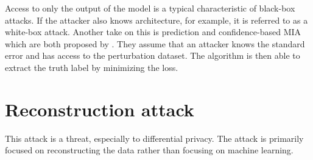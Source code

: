 Access to only the output of the model is a typical characteristic of black-box attacks. If the attacker also knows architecture, for example, it is referred to as a white-box attack.
Another take on this is prediction and confidence-based MIA which are both proposed by \citep{yeom_privacy_2018}.
They assume that an attacker knows the standard error and has access to the perturbation dataset.
The algorithm is then able to extract the truth label by minimizing the loss. \newline






\newpage
\section{Reconstruction attack}
This attack is a threat, especially to differential privacy.
The attack is primarily focused on reconstructing the data rather than focusing on machine learning.


